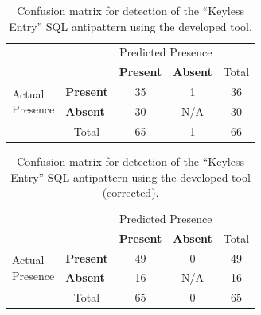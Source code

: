 \begin{table}[H]
    \centering
    \caption{Confusion matrix for detection of the “Keyless Entry” SQL antipattern using the developed tool.}
    \label{tab:keylessEntryConfusion}
    \begin{tabular}{l|l|c|c|c}
        \multicolumn{2}{c}{}&\multicolumn{2}{c}{Predicted Presence}&\\
        \cline{3-4}
        \multicolumn{2}{c|}{}&\textbf{Present}&\textbf{Absent}&\multicolumn{1}{c}{Total}\\
        \cline{2-4}
        \multirow{2}{1.5cm}{Actual\\Presence}& \textbf{Present} & 35 & 1 & 36\\
        \cline{2-4}
        & \textbf{Absent} & 30 & N/A & 30\\
        \cline{2-4}
        \multicolumn{1}{c}{} & \multicolumn{1}{c}{Total} & \multicolumn{1}{c}{65} & \multicolumn{1}{c}{1} & \multicolumn{1}{c}{66}\\
    \end{tabular}
\end{table}

\begin{table}[H]
    \centering
    \caption{Confusion matrix for detection of the “Keyless Entry” SQL antipattern using the developed tool (corrected).}
    \label{tab:keylessEntryConfusionCorrected}
    \begin{tabular}{l|l|c|c|c}
        \multicolumn{2}{c}{}&\multicolumn{2}{c}{Predicted Presence}&\\
        \cline{3-4}
        \multicolumn{2}{c|}{}&\textbf{Present}&\textbf{Absent}&\multicolumn{1}{c}{Total}\\
        \cline{2-4}
        \multirow{2}{1.5cm}{Actual\\Presence}& \textbf{Present} & 49 & 0 & 49\\
        \cline{2-4}
        & \textbf{Absent} & 16 & N/A & 16\\
        \cline{2-4}
        \multicolumn{1}{c}{} & \multicolumn{1}{c}{Total} & \multicolumn{1}{c}{65} & \multicolumn{1}{c}{0} & \multicolumn{1}{c}{65}\\
    \end{tabular}
\end{table}

